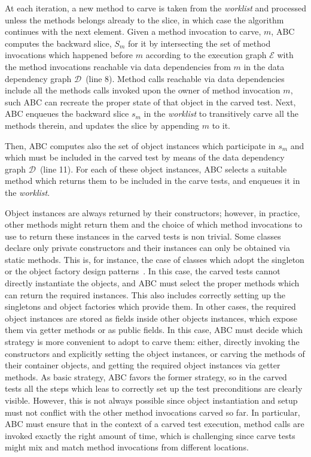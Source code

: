 \documentclass[10pt,conference]{IEEEtran}
\newcommand{\worklist}{\textit{worklist}\xspace}
\newcommand{\abc}{\textsf{ABC}\xspace}
\begin{document}
At each iteration, a new method to carve is taken from the \worklist and processed unless the methods
belongs already to the slice, in which case the algorithm continues with the next element.
%
Given a method invocation to carve, $m$, \abc computes the backward slice, $S_m$ for it by intersecting the set of
method invocations which happened before $m$ according to the execution graph $\mathcal{E}$ with
the method invocations reachable via data dependencies from $m$ in the data dependency graph $\mathcal{D}$~(line 8). 
Method calls reachable via data dependencies include all the methods calls invoked upon
the owner of method invocation $m$, such \abc can recreate the proper state of that object in the carved test.
%
Next, \abc enqueues the backward slice $s_m$ in the \worklist to transitively carve all the methods therein, and
updates the slice by appending $m$ to it.

Then, \abc computes also the set of object instances which participate in $s_m$ and which must be included in the carved
test by means of the data dependency graph $\mathcal{D}$~(line 11). For each of these object instances, \abc selects a
suitable method which returns them to be included in the carve tests, and enqueues it in the \worklist.

Object instances are always returned by their constructors; however, in practice, other methods might return them and the choice
of which method invocations to use to return these instances in the carved tests is non trivial.
%
Some classes declare only private constructors and their instances can only be obtained via static methods. 
This is, for instance, the case of classes which adopt the singleton or the object factory design patterns~\cite{designpatterns}.
%
In this case, the carved tests cannot directly instantiate the objects, and \abc must select the proper methods
which can return the required instances. This also includes correctly setting up the singletons and object factories which
provide them.
%
In other cases, the required object instances are stored as fields inside other objects instances, which expose them
via getter methods or as public fields. In this case, \abc must decide which strategy is more convenient to adopt
to carve them: either, directly invoking the constructors and explicitly setting the object instances, or carving the
methods of their container objects, and getting the required object instances via getter methods.
%
As basic strategy, \abc favors the former strategy, so in the carved tests all the steps which leas to correctly set up
the test preconditions are clearly visible. However, this is not always possible since object instantiation and setup must
not conflict with the other method invocations carved so far. In particular, \abc must ensure that in the context of a carved
test execution, method calls are invoked exactly the right amount of time, which is challenging since carve tests might mix 
and match method invocations from different locations.
\end{document}
